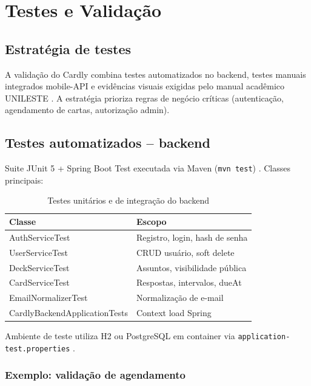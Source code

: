 \chapter{Testes e Validação}
\label{cap:testes}

\section{Estratégia de testes}

A validação do Cardly combina testes automatizados no backend, testes manuais integrados mobile-API e evidências visuais exigidas pelo manual acadêmico UNILESTE \cite{junit5_spring,jest_testing_library,postman_docs}. A estratégia prioriza regras de negócio críticas (autenticação, agendamento de cartas, autorização admin).

\section{Testes automatizados -- backend}

Suite JUnit 5 + Spring Boot Test executada via Maven (\texttt{mvn test}) \cite{junit5_spring}. Classes principais:

\begin{table}[htbp]
    \caption{Testes unitários e de integração do backend}
    \label{tab:testes-backend}
    \centering
    \small
    \begin{tabular}{ll}
        \toprule
        \textbf{Classe} & \textbf{Escopo} \\
        \midrule
        AuthServiceTest & Registro, login, hash de senha \\
        UserServiceTest & CRUD usuário, soft delete \\
        DeckServiceTest & Assuntos, visibilidade pública \\
        CardServiceTest & Respostas, intervalos, dueAt \\
        EmailNormalizerTest & Normalização de e-mail \\
        CardlyBackendApplicationTests & Context load Spring \\
        \bottomrule
    \end{tabular}
\end{table}

Ambiente de teste utiliza H2 ou PostgreSQL em container via \texttt{application-test.properties} \cite{docker_postgres}.

\subsection{Exemplo: validação de agendamento}

